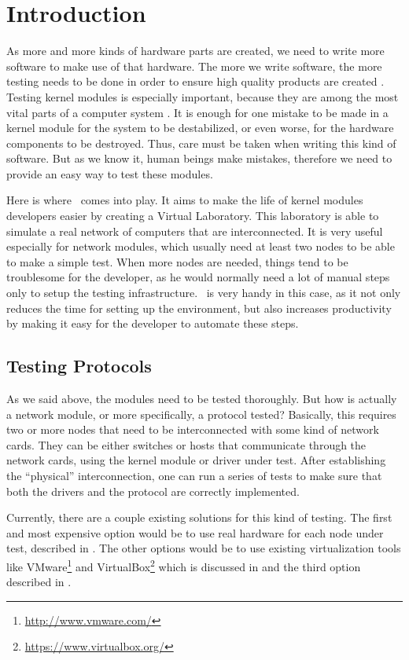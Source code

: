 \chapter{Introduction}
\label{chapter:intro}

As more and more kinds of hardware parts are created, we need to write more software to make use of that hardware.
The more we write software, the more testing needs to be done in order to ensure high quality products are created \cite{myers11}.
Testing kernel modules is especially important, because they are among the most vital parts of a computer system \cite{bligh06}.
It is enough for one mistake to be made in a kernel module for the system to be
destabilized, or even worse, for the hardware components to be destroyed.
Thus, care must be taken when writing this kind of software.
But as we know it, human beings make mistakes, therefore we need to provide an easy way to test these modules.

Here is where \project\ comes into play.
It aims to make the life of kernel modules developers easier by creating a Virtual Laboratory.
This laboratory is able to simulate a real network of computers that are interconnected.
It is very useful especially for network modules, which usually need at least two nodes to be able to make a simple test.
When more nodes are needed, things tend to be troublesome for the developer, as he would normally need a lot of manual steps only to setup the testing infrastructure.
\project\ is very handy in this case, as it not only reduces the time for setting up the environment, but also increases productivity by making it easy for the developer to automate these steps.

\section{Testing Protocols}
\label{sec:proto-testing}

As we said above, the modules need to be tested thoroughly. But how is actually a network module, or more specifically, a protocol tested?
Basically, this requires two or more nodes that need to be interconnected with some kind of network cards.
They can be either switches or hosts that communicate through the network cards, using the kernel module or driver under test.
After establishing the ``physical'' interconnection, one can run a series of tests to make sure that both the drivers and the protocol are correctly implemented.

Currently, there are a couple existing solutions for this kind of testing.
The first and most expensive option would be to use real hardware for each node under test, described in .
The other options would be to use existing virtualization tools like VMware\footnote{\url{http://www.vmware.com/}} and VirtualBox\footnote{\url{https://www.virtualbox.org/}} which is discussed in  and the third option described in .

